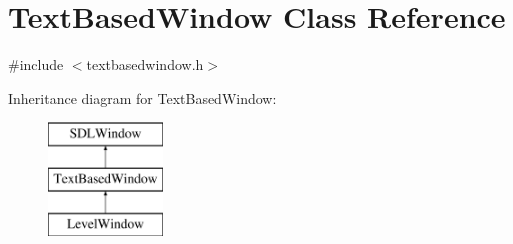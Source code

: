 \hypertarget{class_text_based_window}{}\section{Text\+Based\+Window Class Reference}
\label{class_text_based_window}


{\ttfamily \#include $<$textbasedwindow.\+h$>$}

Inheritance diagram for Text\+Based\+Window\+:\begin{figure}[H]
\begin{center}
\leavevmode
\includegraphics[height=3.000000cm]{class_text_based_window}
\end{center}
\end{figure}
